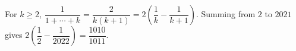 For $k\ge2$, $\dfrac{1}{1+\cdots+k}=\dfrac{2}{k(k+1)}=2(\dfrac{1}{k}-\dfrac{1}{k+1})$. Summing from $2$ to $2021$ gives $2(\dfrac{1}{2}-\dfrac{1}{2022})=\boxed{\dfrac{1010}{1011}}$.
